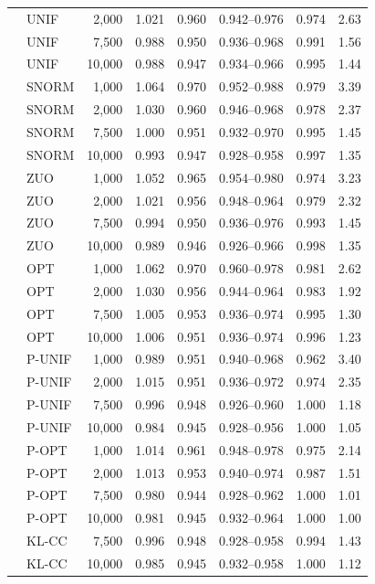 \begin{tabular}{llrrrrrr}
 & UNIF & 2,000 & 1.021 & 0.960 & 0.942--0.976 & 0.974 & 2.63\\
 & UNIF & 7,500 & 0.988 & 0.950 & 0.936--0.968 & 0.991 & 1.56\\
 & UNIF & 10,000 & 0.988 & 0.947 & 0.934--0.966 & 0.995 & 1.44\\
 & SNORM & 1,000 & 1.064 & 0.970 & 0.952--0.988 & 0.979 & 3.39\\
 & SNORM & 2,000 & 1.030 & 0.960 & 0.946--0.968 & 0.978 & 2.37\\
 & SNORM & 7,500 & 1.000 & 0.951 & 0.932--0.970 & 0.995 & 1.45\\
 & SNORM & 10,000 & 0.993 & 0.947 & 0.928--0.958 & 0.997 & 1.35\\
 & ZUO & 1,000 & 1.052 & 0.965 & 0.954--0.980 & 0.974 & 3.23\\
 & ZUO & 2,000 & 1.021 & 0.956 & 0.948--0.964 & 0.979 & 2.32\\
 & ZUO & 7,500 & 0.994 & 0.950 & 0.936--0.976 & 0.993 & 1.45\\
 & ZUO & 10,000 & 0.989 & 0.946 & 0.926--0.966 & 0.998 & 1.35\\
 & OPT & 1,000 & 1.062 & 0.970 & 0.960--0.978 & 0.981 & 2.62\\
 & OPT & 2,000 & 1.030 & 0.956 & 0.944--0.964 & 0.983 & 1.92\\
 & OPT & 7,500 & 1.005 & 0.953 & 0.936--0.974 & 0.995 & 1.30\\
 & OPT & 10,000 & 1.006 & 0.951 & 0.936--0.974 & 0.996 & 1.23\\
 & P-UNIF & 1,000 & 0.989 & 0.951 & 0.940--0.968 & 0.962 & 3.40\\
 & P-UNIF & 2,000 & 1.015 & 0.951 & 0.936--0.972 & 0.974 & 2.35\\
 & P-UNIF & 7,500 & 0.996 & 0.948 & 0.926--0.960 & 1.000 & 1.18\\
 & P-UNIF & 10,000 & 0.984 & 0.945 & 0.928--0.956 & 1.000 & 1.05\\
 & P-OPT & 1,000 & 1.014 & 0.961 & 0.948--0.978 & 0.975 & 2.14\\
 & P-OPT & 2,000 & 1.013 & 0.953 & 0.940--0.974 & 0.987 & 1.51\\
 & P-OPT & 7,500 & 0.980 & 0.944 & 0.928--0.962 & 1.000 & 1.01\\
 & P-OPT & 10,000 & 0.981 & 0.945 & 0.932--0.964 & 1.000 & 1.00\\
 & KL-CC & 7,500 & 0.996 & 0.948 & 0.928--0.958 & 0.994 & 1.43\\
 & KL-CC & 10,000 & 0.985 & 0.945 & 0.932--0.958 & 1.000 & 1.12\\

\end{tabular}
